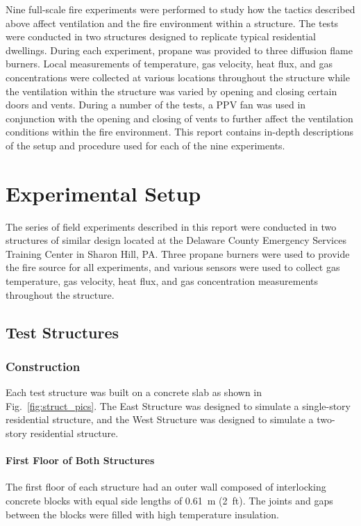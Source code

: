 \documentclass[12pt,oneside]{book}
\begin{document}
Nine full-scale fire experiments were performed to study how the tactics described above affect ventilation and the fire environment within a structure. The tests were conducted in two structures designed to replicate typical residential dwellings. During each experiment, propane was provided to three diffusion flame burners. Local measurements of temperature, gas velocity, heat flux, and gas concentrations were collected at various locations throughout the structure while the ventilation within the structure was varied by opening and closing certain doors and vents. During a number of the tests, a PPV fan was used in conjunction with the opening and closing of vents to further affect the ventilation conditions within the fire environment. This report contains in-depth descriptions of the setup and procedure used for each of the nine experiments.


\chapter{Experimental Setup}
\label{chap:Experimental_Setup}
The series of field experiments described in this report were conducted in two structures of similar design located at the Delaware County Emergency Services Training Center in Sharon Hill, PA. Three propane burners were used to provide the fire source for all experiments, and various sensors were used to collect gas temperature, gas velocity, heat flux, and gas concentration measurements throughout the structure.

\section{Test Structures}
\label{sec:Test_Structures}

\subsection{Construction}
\label{sec:construction}
Each test structure was built on a concrete slab as shown in Fig.~\ref{fig:struct_pics}. The East Structure was designed to simulate a single-story residential structure, and the West Structure was designed to simulate a two-story residential structure. 

\subsubsection{First Floor of Both Structures}
The first floor of each structure had an outer wall composed of interlocking concrete blocks with equal side lengths of 0.61~m (2~ft). The joints and gaps between the blocks were filled with high temperature insulation.
\end{document}
